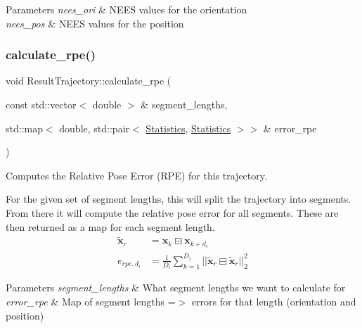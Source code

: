 \begin{DoxyParams}{Parameters}
{\em nees\+\_\+ori} & N\+E\+ES values for the orientation \\
\hline
{\em nees\+\_\+pos} & N\+E\+ES values for the position \\
\hline
\end{DoxyParams}
\mbox{\label{classov__eval_1_1ResultTrajectory_abf4d8b00abdf68692ceaa85b5c1c5b0f}} 
\subsubsection{\texorpdfstring{calculate\+\_\+rpe()}{calculate\_rpe()}}
{\footnotesize\ttfamily void Result\+Trajectory\+::calculate\+\_\+rpe (\begin{DoxyParamCaption}\item[{const std\+::vector$<$ double $>$ \&}]{segment\+\_\+lengths,  }\item[{std\+::map$<$ double, std\+::pair$<$ \hyperlink{structov__eval_1_1Statistics}{Statistics}, \hyperlink{structov__eval_1_1Statistics}{Statistics} $>$$>$ \&}]{error\+\_\+rpe }\end{DoxyParamCaption})}



Computes the Relative Pose Error (R\+PE) for this trajectory. 

For the given set of segment lengths, this will split the trajectory into segments. From there it will compute the relative pose error for all segments. These are then returned as a map for each segment length. \begin{align*} \tilde{\mathbf{x}}_{r} &= \mathbf{x}_{k} \boxminus \mathbf{x}_{k+d_i} \\ e_{rpe,d_i} &= \frac{1}{D_i} \sum_{k=1}^{D_i} ||\tilde{\mathbf{x}}_{r} \boxminus \hat{\tilde{\mathbf{x}}}_{r}||^2_{2} \end{align*}


\begin{DoxyParams}{Parameters}
{\em segment\+\_\+lengths} & What segment lengths we want to calculate for \\
\hline
{\em error\+\_\+rpe} & Map of segment lengths =$>$ errors for that length (orientation and position) \\
\hline
\end{DoxyParams}
\mbox{\label{classov__eval_1_1ResultTrajectory_af47fbcba5026b01aeb00df5c835ba296}} 
